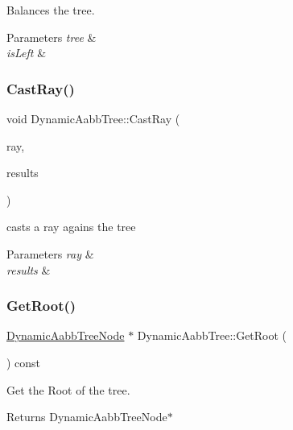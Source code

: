 Balances the tree. 


\begin{DoxyParams}{Parameters}
{\em tree} & \\
\hline
{\em is\+Left} & \\
\hline
\end{DoxyParams}
\mbox{\label{classDynamicAabbTree_a6b696b5d7886bc26ec7ee81a090bbbb9}} 
\subsubsection{\texorpdfstring{Cast\+Ray()}{CastRay()}}
{\footnotesize\ttfamily void Dynamic\+Aabb\+Tree\+::\+Cast\+Ray (\begin{DoxyParamCaption}\item[{const \hyperlink{classRayCant}{Ray\+Cant} \&}]{ray,  }\item[{\hyperlink{classCastResults}{Cast\+Results} \&}]{results }\end{DoxyParamCaption})}



casts a ray agains the tree 


\begin{DoxyParams}{Parameters}
{\em ray} & \\
\hline
{\em results} & \\
\hline
\end{DoxyParams}
\mbox{\label{classDynamicAabbTree_ad0e823a4a4e9bef83b3fb8d846d078e0}} 
\subsubsection{\texorpdfstring{Get\+Root()}{GetRoot()}}
{\footnotesize\ttfamily \hyperlink{classDynamicAabbTreeNode}{Dynamic\+Aabb\+Tree\+Node} $\ast$ Dynamic\+Aabb\+Tree\+::\+Get\+Root (\begin{DoxyParamCaption}{ }\end{DoxyParamCaption}) const}



Get the Root of the tree. 

\begin{DoxyReturn}{Returns}
Dynamic\+Aabb\+Tree\+Node$\ast$ 
\end{DoxyReturn}
\mbox{\label{classDynamicAabbTree_a1ede16b26b57e97564fb605f65acb4b6}} 
